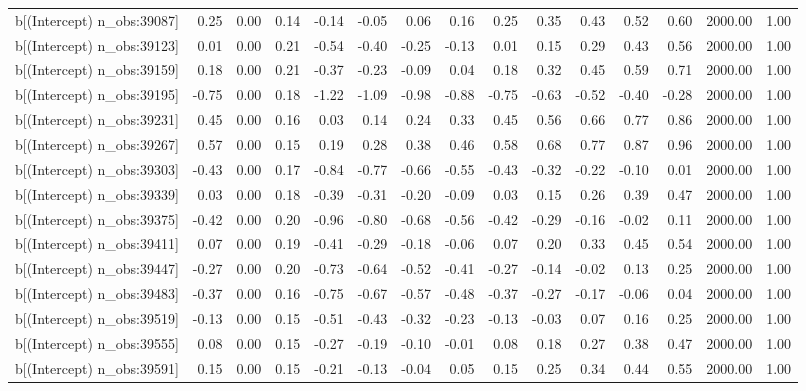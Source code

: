 \begin{table}[ht]
\begin{tabular}{rrrrrrrrrrrrrrr}
  b[(Intercept) n\_obs:39087] & 0.25 & 0.00 & 0.14 & -0.14 & -0.05 & 0.06 & 0.16 & 0.25 & 0.35 & 0.43 & 0.52 & 0.60 & 2000.00 & 1.00 \\ 
  b[(Intercept) n\_obs:39123] & 0.01 & 0.00 & 0.21 & -0.54 & -0.40 & -0.25 & -0.13 & 0.01 & 0.15 & 0.29 & 0.43 & 0.56 & 2000.00 & 1.00 \\ 
  b[(Intercept) n\_obs:39159] & 0.18 & 0.00 & 0.21 & -0.37 & -0.23 & -0.09 & 0.04 & 0.18 & 0.32 & 0.45 & 0.59 & 0.71 & 2000.00 & 1.00 \\ 
  b[(Intercept) n\_obs:39195] & -0.75 & 0.00 & 0.18 & -1.22 & -1.09 & -0.98 & -0.88 & -0.75 & -0.63 & -0.52 & -0.40 & -0.28 & 2000.00 & 1.00 \\ 
  b[(Intercept) n\_obs:39231] & 0.45 & 0.00 & 0.16 & 0.03 & 0.14 & 0.24 & 0.33 & 0.45 & 0.56 & 0.66 & 0.77 & 0.86 & 2000.00 & 1.00 \\ 
  b[(Intercept) n\_obs:39267] & 0.57 & 0.00 & 0.15 & 0.19 & 0.28 & 0.38 & 0.46 & 0.58 & 0.68 & 0.77 & 0.87 & 0.96 & 2000.00 & 1.00 \\ 
  b[(Intercept) n\_obs:39303] & -0.43 & 0.00 & 0.17 & -0.84 & -0.77 & -0.66 & -0.55 & -0.43 & -0.32 & -0.22 & -0.10 & 0.01 & 2000.00 & 1.00 \\ 
  b[(Intercept) n\_obs:39339] & 0.03 & 0.00 & 0.18 & -0.39 & -0.31 & -0.20 & -0.09 & 0.03 & 0.15 & 0.26 & 0.39 & 0.47 & 2000.00 & 1.00 \\ 
  b[(Intercept) n\_obs:39375] & -0.42 & 0.00 & 0.20 & -0.96 & -0.80 & -0.68 & -0.56 & -0.42 & -0.29 & -0.16 & -0.02 & 0.11 & 2000.00 & 1.00 \\ 
  b[(Intercept) n\_obs:39411] & 0.07 & 0.00 & 0.19 & -0.41 & -0.29 & -0.18 & -0.06 & 0.07 & 0.20 & 0.33 & 0.45 & 0.54 & 2000.00 & 1.00 \\ 
  b[(Intercept) n\_obs:39447] & -0.27 & 0.00 & 0.20 & -0.73 & -0.64 & -0.52 & -0.41 & -0.27 & -0.14 & -0.02 & 0.13 & 0.25 & 2000.00 & 1.00 \\ 
  b[(Intercept) n\_obs:39483] & -0.37 & 0.00 & 0.16 & -0.75 & -0.67 & -0.57 & -0.48 & -0.37 & -0.27 & -0.17 & -0.06 & 0.04 & 2000.00 & 1.00 \\ 
  b[(Intercept) n\_obs:39519] & -0.13 & 0.00 & 0.15 & -0.51 & -0.43 & -0.32 & -0.23 & -0.13 & -0.03 & 0.07 & 0.16 & 0.25 & 2000.00 & 1.00 \\ 
  b[(Intercept) n\_obs:39555] & 0.08 & 0.00 & 0.15 & -0.27 & -0.19 & -0.10 & -0.01 & 0.08 & 0.18 & 0.27 & 0.38 & 0.47 & 2000.00 & 1.00 \\ 
  b[(Intercept) n\_obs:39591] & 0.15 & 0.00 & 0.15 & -0.21 & -0.13 & -0.04 & 0.05 & 0.15 & 0.25 & 0.34 & 0.44 & 0.55 & 2000.00 & 1.00 \\ 

\end{tabular}
\end{table}
